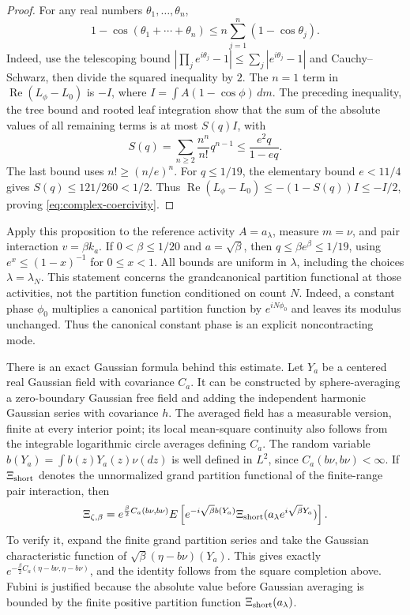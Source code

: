 \documentclass[11pt]{article}
\theoremstyle{remark}\newtheorem{remark}[theorem]{Remark}
\begin{document}
\begin{proof}
For any real numbers $\theta_1,\ldots,\theta_n$,
\[
 1-\cos(\theta_1+\cdots+\theta_n)
 \le n\sum_{j=1}^n(1-\cos\theta_j).
\]
Indeed, use the telescoping bound
$|\prod_j e^{i\theta_j}-1|\le\sum_j|e^{i\theta_j}-1|$
and Cauchy--Schwarz, then divide the squared inequality by $2$.
The $n=1$ term in $\operatorname{Re}(L_\phi-L_0)$ is
$-I$, where $I=\int A(1-\cos\phi)\,dm$.  The preceding inequality,
the tree bound and rooted leaf integration show that the sum of the
absolute values of all remaining terms is at most $S(q)I$, with
\[
 S(q)=\sum_{n\ge2}\frac{n^n}{n!}q^{n-1}
 \le\frac{e^2q}{1-eq}.
\]
The last bound uses $n!\ge(n/e)^n$.
For $q\le1/19$, the elementary bound $e<11/4$ gives
$S(q)\le121/260<1/2$.  Thus
$\operatorname{Re}(L_\phi-L_0)\le-(1-S(q))I\le-I/2$, proving
\eqref{eq:complex-coercivity}.
\end{proof}

Apply this proposition to the reference activity $A=a_\lambda$, measure
$m=\nu$, and pair interaction $v=\beta k_a$.  If
$0<\beta\le1/20$ and $a=\sqrt\beta$, then
$q\le\beta e^\beta\le1/19$, using
$e^x\le(1-x)^{-1}$ for $0\le x<1$. All bounds are uniform in
$\lambda$, including the choices $\lambda=\lambda_N$. This statement
concerns the grandcanonical partition functional at those activities,
not the partition function conditioned on count $N$. Indeed, a constant
phase $\phi_0$ multiplies a canonical partition function by
$e^{iN\phi_0}$ and leaves its modulus unchanged. Thus the canonical
constant phase is an explicit noncontracting mode.

There is an exact Gaussian formula behind this estimate.  Let $Y_a$ be
a centered real Gaussian field with covariance $C_a$.  It can be
constructed by sphere-averaging a zero-boundary Gaussian free field and
adding the independent harmonic Gaussian series with covariance $h$.
The averaged field has a measurable version, finite at every interior
point; its local mean-square continuity also follows from the integrable
logarithmic circle averages defining $C_a$.  The random variable
$b(Y_a)=\int b(z)Y_a(z)\nu(dz)$ is well defined in $L^2$, since
$C_a(b\nu,b\nu)<\infty$.  If $\Xi_{\rm short}$ denotes the
unnormalized grand partition functional of the finite-range pair
interaction, then
\begin{equation}\label{eq:exact-imaginary-field}
 \Xi_{\zeta,\beta}
 =e^{\frac\beta2C_a(b\nu,b\nu)}
 E\left[e^{-i\sqrt\beta b(Y_a)}
       \Xi_{\rm short}(a_\lambda e^{i\sqrt\beta Y_a})\right].
\end{equation}
To verify it, expand the finite grand partition series and take the
Gaussian characteristic function of
$\sqrt\beta(\eta-b\nu)(Y_a)$.  This gives exactly
$e^{-\frac\beta2C_a(\eta-b\nu,\eta-b\nu)}$, and the identity follows
from the square completion above.  Fubini is justified because the
absolute value before Gaussian averaging is bounded by the finite
positive partition function $\Xi_{\rm short}(a_\lambda)$.
\end{document}
